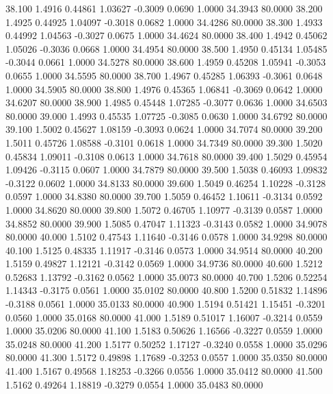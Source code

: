   38.100   1.4916   0.44861   1.03627  -0.3009   0.0690   1.0000  34.3943  80.0000
  38.200   1.4925   0.44925   1.04097  -0.3018   0.0682   1.0000  34.4286  80.0000
  38.300   1.4933   0.44992   1.04563  -0.3027   0.0675   1.0000  34.4624  80.0000
  38.400   1.4942   0.45062   1.05026  -0.3036   0.0668   1.0000  34.4954  80.0000
  38.500   1.4950   0.45134   1.05485  -0.3044   0.0661   1.0000  34.5278  80.0000
  38.600   1.4959   0.45208   1.05941  -0.3053   0.0655   1.0000  34.5595  80.0000
  38.700   1.4967   0.45285   1.06393  -0.3061   0.0648   1.0000  34.5905  80.0000
  38.800   1.4976   0.45365   1.06841  -0.3069   0.0642   1.0000  34.6207  80.0000
  38.900   1.4985   0.45448   1.07285  -0.3077   0.0636   1.0000  34.6503  80.0000
  39.000   1.4993   0.45535   1.07725  -0.3085   0.0630   1.0000  34.6792  80.0000
  39.100   1.5002   0.45627   1.08159  -0.3093   0.0624   1.0000  34.7074  80.0000
  39.200   1.5011   0.45726   1.08588  -0.3101   0.0618   1.0000  34.7349  80.0000
  39.300   1.5020   0.45834   1.09011  -0.3108   0.0613   1.0000  34.7618  80.0000
  39.400   1.5029   0.45954   1.09426  -0.3115   0.0607   1.0000  34.7879  80.0000
  39.500   1.5038   0.46093   1.09832  -0.3122   0.0602   1.0000  34.8133  80.0000
  39.600   1.5049   0.46254   1.10228  -0.3128   0.0597   1.0000  34.8380  80.0000
  39.700   1.5059   0.46452   1.10611  -0.3134   0.0592   1.0000  34.8620  80.0000
  39.800   1.5072   0.46705   1.10977  -0.3139   0.0587   1.0000  34.8852  80.0000
  39.900   1.5085   0.47047   1.11323  -0.3143   0.0582   1.0000  34.9078  80.0000
  40.000   1.5102   0.47543   1.11640  -0.3146   0.0578   1.0000  34.9298  80.0000
  40.100   1.5125   0.48335   1.11917  -0.3146   0.0573   1.0000  34.9514  80.0000
  40.200   1.5159   0.49827   1.12121  -0.3142   0.0569   1.0000  34.9736  80.0000
  40.600   1.5212   0.52683   1.13792  -0.3162   0.0562   1.0000  35.0073  80.0000
  40.700   1.5206   0.52254   1.14343  -0.3175   0.0561   1.0000  35.0102  80.0000
  40.800   1.5200   0.51832   1.14896  -0.3188   0.0561   1.0000  35.0133  80.0000
  40.900   1.5194   0.51421   1.15451  -0.3201   0.0560   1.0000  35.0168  80.0000
  41.000   1.5189   0.51017   1.16007  -0.3214   0.0559   1.0000  35.0206  80.0000
  41.100   1.5183   0.50626   1.16566  -0.3227   0.0559   1.0000  35.0248  80.0000
  41.200   1.5177   0.50252   1.17127  -0.3240   0.0558   1.0000  35.0296  80.0000
  41.300   1.5172   0.49898   1.17689  -0.3253   0.0557   1.0000  35.0350  80.0000
  41.400   1.5167   0.49568   1.18253  -0.3266   0.0556   1.0000  35.0412  80.0000
  41.500   1.5162   0.49264   1.18819  -0.3279   0.0554   1.0000  35.0483  80.0000
